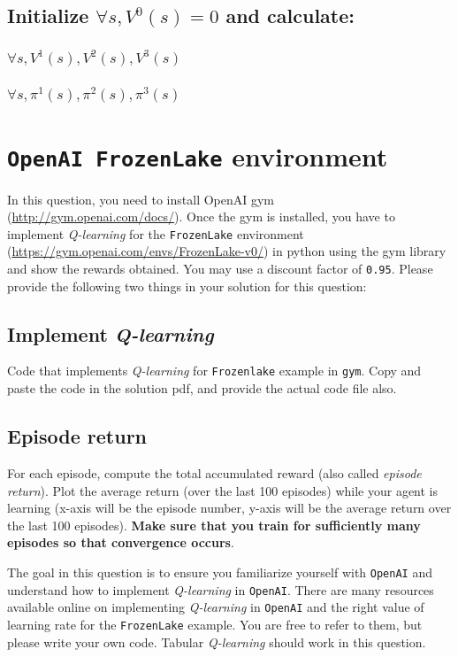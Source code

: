 \documentclass[12pt, letterpaper]{article}
\begin{document}
\subsection{Initialize $\forall s,V^0(s)=0$ and calculate:}

\subsubsection{$\forall s,V^1(s),V^2(s),V^3(s)$}

\subsubsection{$\forall s,\pi^1(s),\pi^2(s),\pi^3(s)$}

\section{\texttt{OpenAI FrozenLake} environment}

In this question, you need to install OpenAI gym (\href{http://gym.openai.com/docs/}{http://gym.openai.com/docs/}). 
Once the gym is installed, you have to implement \textit{Q-learning} for the \texttt{FrozenLake} environment (\href{https://gym.openai.com/envs/FrozenLake-v0/}{https://gym.openai.com/envs/FrozenLake-v0/}) in python using the gym library and show the rewards obtained. 
You may use a discount factor of \texttt{0.95}. 
Please provide the following two things in your solution for this question: 

\subsection{Implement \textit{Q-learning}}
Code that implements \textit{Q-learning} for \texttt{Frozenlake} example in \texttt{gym}. 
Copy and paste the code in the solution pdf, and provide the actual code file also.

\subsection{Episode return}
For each episode, compute the total accumulated reward (also called \textit{episode return}). Plot the average return (over the last 100 episodes) while your agent is learning (x-axis will be the episode number, y-axis will be the average return over the last 100 episodes). \textbf{Make sure that you train for sufficiently many episodes so that convergence occurs}.

The goal in this question is to ensure you familiarize yourself with \texttt{OpenAI} and understand how to implement \textit{Q-learning} in \texttt{OpenAI}. 
There are many resources available online on implementing \textit{Q-learning} in \texttt{OpenAI} and the right value of learning rate for the \texttt{FrozenLake} example.
You are free to refer to them, but please write your own code. 
Tabular \textit{Q-learning} should work in this question.
\end{document}
